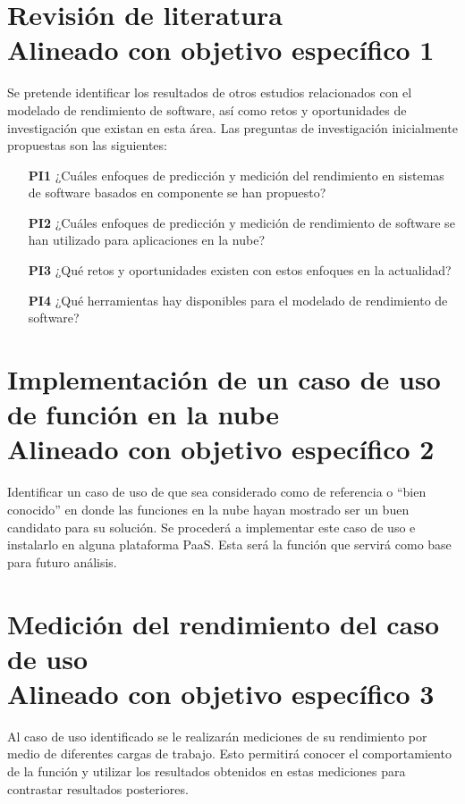 \section[Revisión de literatura]{Revisión de literatura\\\small{Alineado con objetivo específico 1}}
Se pretende identificar los resultados de otros estudios relacionados con el modelado de rendimiento de software, así como retos y oportunidades de investigación que existan en esta área. Las preguntas de investigación inicialmente propuestas son las siguientes:
\begin{itemize}
    \item[\textbf{PI1}] ¿Cuáles enfoques de predicción y medición del rendimiento en sistemas de software basados en componente se han propuesto?
    \item[\textbf{PI2}] ¿Cuáles enfoques de predicción y medición de rendimiento de software se han utilizado para aplicaciones en la nube?
    \item[\textbf{PI3}] ¿Qué retos y oportunidades existen con estos enfoques en la actualidad?
    \item[\textbf{PI4}] ¿Qué herramientas hay disponibles para el modelado de rendimiento de software?
\end{itemize}

\section[Implementación de caso de uso de función en la nube]{Implementación de un caso de uso de función en la nube\\\small{Alineado con objetivo específico 2}}

Identificar un caso de uso de que sea considerado como de referencia o ``bien conocido'' en donde las funciones en la nube hayan mostrado ser un buen candidato para su solución. Se procederá a implementar este caso de uso e instalarlo en alguna plataforma PaaS. Esta será la función que servirá como base para futuro análisis.

\section[Medición del rendimiento del caso de uso]{Medición del rendimiento del caso de uso\\\small{Alineado con objetivo específico 3}}
Al caso de uso identificado se le realizarán mediciones de su rendimiento por medio de diferentes cargas de trabajo. Esto permitirá conocer el comportamiento de la función y utilizar los resultados obtenidos en estas mediciones para contrastar resultados posteriores.

